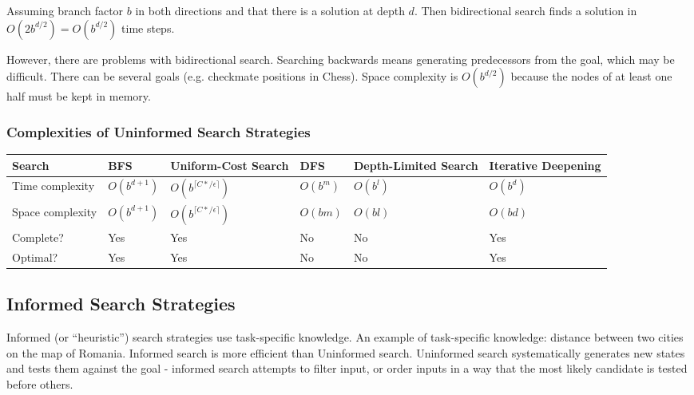 Assuming branch factor $b$ in both directions and that there is a solution at
depth $d$. Then bidirectional search finds a solution in $O(2b^{d/2}) =
O(b^{d/2})$ time steps.

However, there are problems with bidirectional search. Searching backwards
means generating predecessors from the goal, which may be difficult. There can
be several goals (e.g. checkmate positions in Chess). Space complexity is
$O(b^{d/2})$ because the nodes of at least one half must be kept in memory.

\subsubsection{Complexities of Uninformed Search Strategies}

\begin{tabular}{| l | p{1.3cm} | p{2.8cm} | p{1cm} | p{2.8cm} | p{2cm} |}
\hline
Search & BFS & Uniform-Cost Search & DFS & Depth-Limited Search & Iterative Deepening\\ \hline
Time complexity & $O(b^{d+1})$ & $O(b^{\lceil C*/\epsilon\rceil})$ & $O(b^m)$ & $O(b^l)$ &
$O(b^d)$\\ \hline
Space complexity & $O(b^{d+1})$ & $O(b^{\lceil C*/\epsilon\rceil})$ & $O(bm)$ &
$O(bl)$ & $O(bd)$\\ \hline
Complete? & Yes\footnotemark & Yes\footnotemark & No & No &
Yes\footnotemark[1]\\ \hline
Optimal? & Yes\footnotemark
& Yes & No & No & Yes\footnotemark[3]\\
\hline
\end{tabular}

\subsection{Informed Search Strategies}
Informed (or ``heuristic'') search strategies use task-specific knowledge.
An example of task-specific knowledge: distance between two cities on the map
of Romania.
Informed search is more efficient than Uninformed search.
Uninformed search systematically generates new states and tests them against
the goal - informed search attempts to filter input, or order inputs in a way
that the most likely candidate is tested before others.
